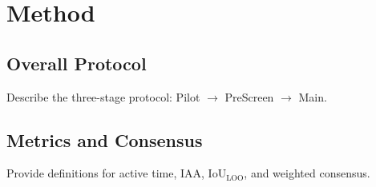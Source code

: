 \section{Method}
\subsection{Overall Protocol}
Describe the three-stage protocol: Pilot $\rightarrow$ PreScreen $\rightarrow$ Main.
\subsection{Metrics and Consensus}
Provide definitions for active time, $\mathrm{IAA}$, $\mathrm{IoU}_{\mathrm{LOO}}$, and weighted consensus.
